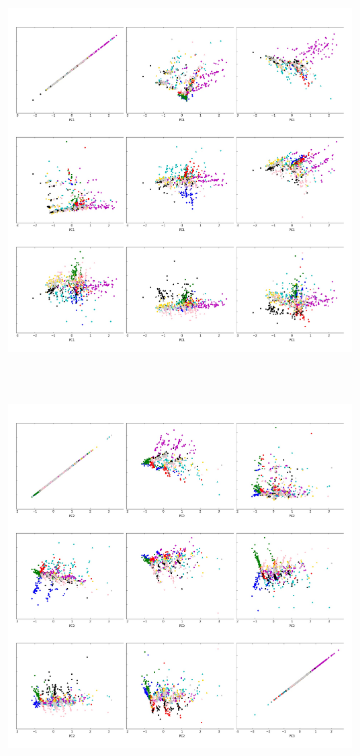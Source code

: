 \newpage

\begin{figure}[ht!]	
\centering
	\begin{subfigure}[b]{0.45\textwidth}
		\includegraphics[width=\linewidth]{img/sanger/9dim-COLLAGE1}
	\end{subfigure}%
	~
	\begin{subfigure}[b]{0.45\textwidth}
		\includegraphics[width=\linewidth]{img/sanger/9dim-COLLAGE2}
	\end{subfigure}%


\end{figure}
